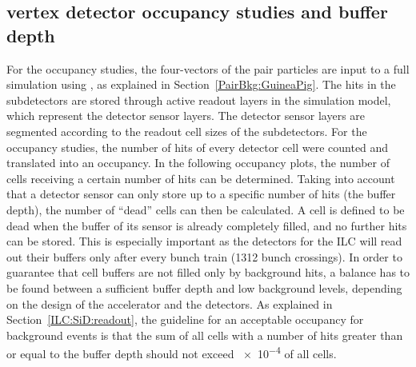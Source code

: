 \subsection{\sid vertex detector occupancy studies and buffer depth}
\label{PairBkg:occupancy}
For the occupancy studies, the \guineapig four-vectors of the pair particles are input to a full \sid simulation using \slic, as explained in Section~\ref{PairBkg:GuineaPig}.
The hits in the \sid subdetectors are stored through active readout layers in the simulation model, which represent the detector sensor layers.
The detector sensor layers are segmented according to the readout cell sizes of the \sid subdetectors.
For the occupancy studies, the number of hits of every detector cell were counted and translated into an occupancy.
In the following occupancy plots, the number of cells receiving a certain number of hits can be determined.
Taking into account that a detector sensor can only store up to a specific number of hits (the buffer depth), the number of ``dead'' cells can then be calculated.
A cell is defined to be dead when the buffer of its sensor is already completely filled, and no further hits can be stored.
This is especially important as the detectors for the ILC will read out their buffers only after every bunch train (\num{1312} bunch crossings).
In order to guarantee that cell buffers are not filled only by background hits, a balance has to be found between a sufficient buffer depth and low background levels, depending on the design of the accelerator and the detectors.
As explained in Section~\ref{ILC:SiD:readout}, the \sid guideline for an acceptable occupancy for background events is that the sum of all cells with a number of hits greater than or equal to the buffer depth should not exceed \num{e-4} of all cells.

